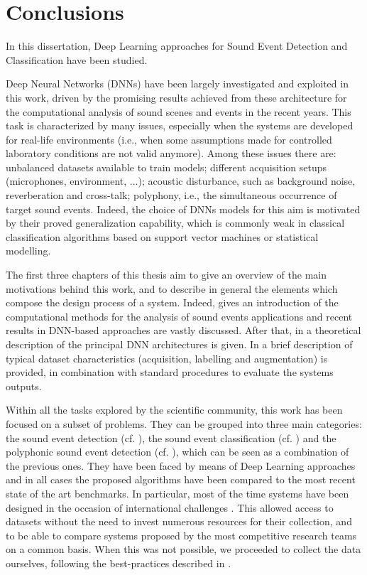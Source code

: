 \chapter{Conclusions}

In this dissertation, Deep Learning approaches for Sound Event Detection and Classification have been studied. 

Deep Neural Networks (DNNs) have been largely investigated
and exploited in this work, driven by the promising results achieved from these architecture for the computational analysis of sound scenes and events in the recent years. This task is characterized by many issues, especially when the systems are developed for real-life environments (i.e., when some assumptions made for controlled laboratory conditions are not valid anymore). Among these issues there are: unbalanced datasets available to train models; different acquisition setups (microphones, environment, ...); acoustic disturbance, such as background noise, reverberation and cross-talk; polyphony, i.e., the simultaneous occurrence of target sound events.
Indeed, the choice of DNNs models for this aim
is motivated by their proved generalization capability, which is commonly weak in
classical classification algorithms based on support vector machines or statistical modelling.

The first three chapters of this thesis aim to give an overview of the main
motivations behind this work, and to describe in general the elements which compose the design process of a system. Indeed,  gives an introduction of the computational methods for the analysis of sound events applications and recent results in DNN-based approaches are vastly discussed. After that, in  a theoretical description of the principal DNN architectures is given. In  a brief description of typical dataset characteristics (acquisition, labelling and augmentation) is provided, in combination with standard procedures to evaluate the systems outputs.

Within all the tasks explored by the scientific community, this work has been focused on a subset of problems. They can be grouped into three main categories: the sound event detection (cf. ), the sound event classification (cf. ) and the polyphonic sound event detection (cf. ), which can be seen as a combination of the previous ones.
They have been faced by means of Deep Learning approaches and in all cases the proposed algorithms have been compared to the most recent state of the art benchmarks. In particular, most of the time systems have been designed in the occasion of international challenges \cite{mesaros2016tut,DCASE2017challenge,ComParE2017,dcase2018web}. This allowed access to datasets without the need to invest numerous resources for their collection, and to be able to compare systems proposed by the most competitive research teams on a common basis. When this was not possible, we proceeded to collect the data ourselves, following the best-practices described in .

